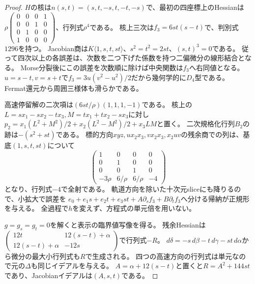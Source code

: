 \begin{proof}
$H$の核は$n(s,t)=(s,t,-s,t,-t,-s)$で、最初の四座標上のHessianは
$\rho\left(\begin{smallmatrix}0&0&0&1\\0&0&1&0\\0&1&0&0\\1&0&0&0\end{smallmatrix}\right)$、行列式$\rho^4$である。
核上三次は$f_3=6st(s-t)$で、判別式$1296$を持つ。
Jacobian商は$K\langle1,s,t,st\rangle$、$s^2=t^2=2st$、$(s,t)^3=0$である。
従って四次以上の各誤差は、次数を二つ下げた係数を持つ二偏微分の線形結合となる。
Morse分裂後にこの誤差を次数順に除けば中央関数は$f_3$へ右同値となる。
$u=s-t,v=s+t$で$f_3=3u(v^2-u^2)/2$だから幾何学的に$D_4$型である。
Fermat還元から周囲三様体も滑らかである。

高速停留解の二次項は$(6st/\rho)(1,1,1,-1)$である。
核上の$L=sx_1-sx_2-tx_3,M=tx_1+tx_2-sx_3$に対し
$p_2=x_1(L^2+M^2)/2+x_2(L^2-M^2)/2+x_3LM$と置く。
二次規格化行列$B_2$の跡は$-(s^2+st)$である。
標的方向$xyz,ux_2x_3,vx_2x_3,x_2uv$の残余商での列は、基底$(1,s,t,st)$について
\[
 \begin{pmatrix}1&0&0&0\\0&1&0&0\\0&0&1&0\\-3\rho&6/\rho&6/\rho&-4\end{pmatrix}
\]
となり、行列式$-4$で全射である。
軌道方向を除いた十次元sliceにも降りるので、小拡大で誤差を
$e_0+e_1s+e_2t+e_3st+A\partial_sf_3+B\partial_tf_3$へ分ける帰納が正規形を与える。
全過程で$h$を変えず、方程式の単元倍を用いない。

$g=g_s=g_t=0$を解くと表示の臨界値写像を得る。
残余Hessianは
$\left(\begin{smallmatrix}12t&12(s-t)+\alpha\\12(s-t)+\alpha&-12s\end{smallmatrix}\right)$で行列式$-R$。
$d\delta=-s\,d\beta-t\,d\gamma-st\,d\alpha$から微分の最大小行列式も$R$で生成される。
四つの高速方向の行列式は単元なので元の$\Delta$も同じイデアルを与える。
$A=\alpha+12(s-t)$と置くと$R=A^2+144st$であり、Jacobianイデアルは$(A,s,t)$である。
\end{proof}

